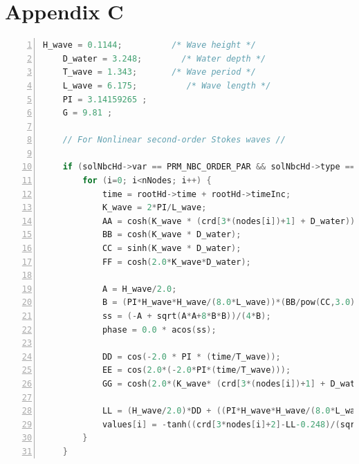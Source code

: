 \documentclass[12pt]{article} %
\begin{document}
\section{Appendix C}
\begin{lstlisting}[language=C, caption={Hard code for inlet wave run-up}, label={lst:wave_runup}, basicstyle=\ttfamily\footnotesize, keywordstyle=\color{blue}, commentstyle=\color{green}, numbers=left, numberstyle=\tiny\color{gray}, breaklines=true]
    H_wave = 0.1144;          /* Wave height */
    D_water = 3.248;        /* Water depth */
    T_wave = 1.343;       /* Wave period */
    L_wave = 6.175;          /* Wave length */
    PI = 3.14159265 ;
    G = 9.81 ;
    
    // For Nonlinear second-order Stokes waves //
    
    if (solNbcHd->var == PRM_NBC_ORDER_PAR && solNbcHd->type == PRM_NBC_USR_DEF) {
        for (i=0; i<nNodes; i++) {
            time = rootHd->time + rootHd->timeInc;
            K_wave = 2*PI/L_wave;
            AA = cosh(K_wave * (crd[3*(nodes[i])+1] + D_water));
            BB = cosh(K_wave * D_water);
            CC = sinh(K_wave * D_water);
            FF = cosh(2.0*K_wave*D_water);
    
            A = H_wave/2.0;
            B = (PI*H_wave*H_wave/(8.0*L_wave))*(BB/pow(CC,3.0))*(2.0+FF);
            ss = (-A + sqrt(A*A+8*B*B))/(4*B);
            phase = 0.0 * acos(ss);
    
            DD = cos(-2.0 * PI * (time/T_wave));
            EE = cos(2.0*(-2.0*PI*(time/T_wave)));
            GG = cosh(2.0*(K_wave* (crd[3*(nodes[i])+1] + D_water)));
    
            LL = (H_wave/2.0)*DD + ((PI*H_wave*H_wave/(8.0*L_wave))*(BB/pow(CC,3.0))*(2.0+FF)*EE);
            values[i] = -tanh((crd[3*nodes[i]+2]-LL-0.248)/(sqrt(2) * rootHd->epsilon));
        }
    }
    \end{lstlisting}
\end{document}
